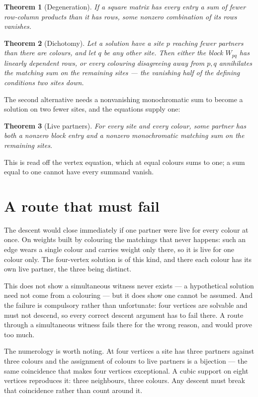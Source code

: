 \documentclass[11pt]{article}
\newtheorem{theorem}{Theorem}[section]
\theoremstyle{definition}
\theoremstyle{remark}
\begin{document}
\begin{theorem}[Degeneration]
If a square matrix has every entry a sum of fewer row-column products than it has rows,
some nonzero combination of its rows vanishes.
\end{theorem}

\begin{theorem}[Dichotomy]
Let a solution have a site $p$ reaching fewer partners than there are colours, and let
$q$ be any other site. Then either the block $W_{pq}$ has linearly dependent rows, or
every colouring disagreeing away from $p,q$ annihilates the matching sum on the
remaining sites --- the vanishing half of the defining conditions two sites down.
\end{theorem}

The second alternative needs a nonvanishing monochromatic sum to become a solution on
two fewer sites, and the equations supply one:

\begin{theorem}[Live partners]
For every site and every colour, some partner has both a nonzero block entry and a
nonzero monochromatic matching sum on the remaining sites.
\end{theorem}

This is read off the vertex equation, which at equal colours sums to one; a sum equal to
one cannot have every summand vanish.

\section{A route that must fail}\label{sec:mustfail}

The descent would close immediately if one partner were live for every colour at once.
On weights built by colouring the matchings that never happens: such an edge wears a
single colour and carries weight only there, so it is live for one colour only. The
four-vertex solution is of this kind, and there each colour has its own live partner,
the three being distinct.

This does not show a simultaneous witness never exists --- a hypothetical solution need
not come from a colouring --- but it does show one cannot be assumed. And the failure is
compulsory rather than unfortunate: four vertices are solvable and must not descend, so
every correct descent argument has to fail there. A route through a simultaneous witness
fails there for the wrong reason, and would prove too much.

The numerology is worth noting. At four vertices a site has three partners against three
colours and the assignment of colours to live partners is a bijection --- the same
coincidence that makes four vertices exceptional. A cubic support on eight vertices
reproduces it: three neighbours, three colours. Any descent must break that coincidence
rather than count around it.
\end{document}
